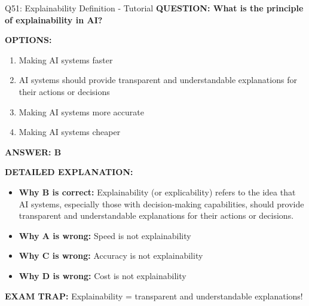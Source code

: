 \documentclass[8pt]{beamer}
\begin{document}
	\begin{frame}{Q51: Explainability Definition - Tutorial}
		\fontsize{6.5}{7.5}\selectfont
		\textbf{QUESTION: What is the principle of explainability in AI?}
		
		\vspace{0.1cm}
		\textbf{OPTIONS:}
		\begin{enumerate}
			\item Making AI systems faster
			\item AI systems should provide transparent and understandable explanations for their actions or decisions
			\item Making AI systems more accurate
			\item Making AI systems cheaper
		\end{enumerate}
		
		\vspace{0.1cm}
		\textcolor{myblue}{\textbf{ANSWER: B}}
		
		\vspace{0.1cm}
		\textbf{DETAILED EXPLANATION:}
		\begin{itemize}
			\item \textbf{Why B is correct:} Explainability (or explicability) refers to the idea that AI systems, especially those with decision-making capabilities, should provide transparent and understandable explanations for their actions or decisions.
			\item \textbf{Why A is wrong:} Speed is not explainability
			\item \textbf{Why C is wrong:} Accuracy is not explainability
			\item \textbf{Why D is wrong:} Cost is not explainability
		\end{itemize}
		
		\textcolor{myred}{\textbf{EXAM TRAP:}} Explainability = \textcolor{myblue}{transparent and understandable explanations}!
	\end{frame}
	
\end{document}
